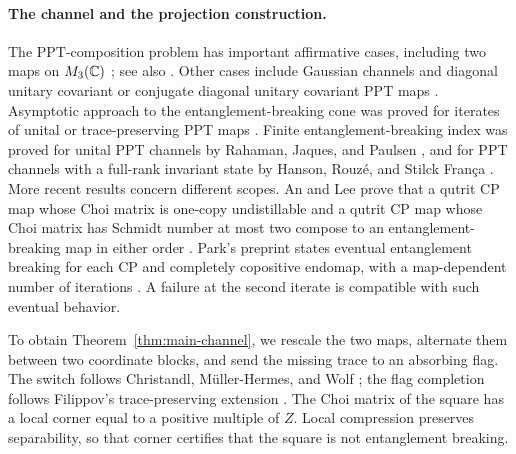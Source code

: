 \paragraph{The channel and the projection construction.}
The PPT-composition problem has important affirmative cases, including two
maps on $M_{3}(\mathbb C)$ \cite[Corollary III.1]{CMHW2019}; see also
\cite{ChenYangTang2019}.  Other cases include Gaussian channels
\cite{CMHW2019} and diagonal unitary covariant or conjugate diagonal
unitary covariant PPT maps \cite[Theorem~4.5]{SinghNechita2022}.
Asymptotic approach to the entanglement-breaking cone was proved for
iterates of unital or trace-preserving PPT maps
\cite[Theorem~3.3]{KMP2018}.  Finite entanglement-breaking index was
proved for unital PPT channels by Rahaman, Jaques, and Paulsen
\cite[Theorem~4.4]{RahamanJaquesPaulsen2018}, and for PPT channels with a
full-rank invariant state by Hanson, Rouz\'e, and Stilck Fran\c ca
\cite[Theorem~3.10]{HansonRouzeFranca2020}.
More recent results concern different scopes.  An and Lee prove that a
qutrit CP map whose Choi matrix is one-copy undistillable and a qutrit CP
map whose Choi matrix has Schmidt number at most two compose to an
entanglement-breaking map in either order \cite[Theorem~4]{AnLee2026}.
Park's preprint states eventual entanglement breaking for each CP and
completely copositive endomap, with a map-dependent number of iterations
\cite[Theorem~1.1]{Park2026}.  A failure at the second iterate is
compatible with such eventual behavior.

To obtain Theorem~\ref{thm:main-channel}, we rescale the two maps, alternate
them between two coordinate blocks, and send the missing trace to an
absorbing flag.  The switch follows Christandl, M\"uller-Hermes, and Wolf
\cite[Section IV.A]{CMHW2019}; the flag completion follows Filippov's
trace-preserving extension \cite[Proposition 3, Equation (15)]{Filippov2021}.
The Choi matrix of the square has a local corner equal to a positive multiple
of $Z$.  Local compression preserves separability, so that corner certifies
that the square is not entanglement breaking.

